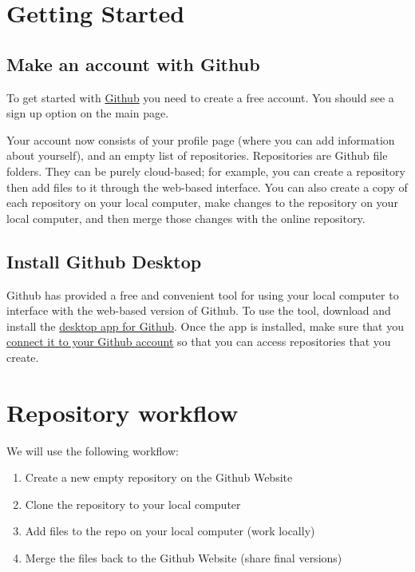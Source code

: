 \documentclass[]{book}
\providecommand{\tightlist}{%
  \setlength{\itemsep}{0pt}\setlength{\parskip}{0pt}}
\theoremstyle{definition}
\theoremstyle{definition}
\theoremstyle{definition}
\theoremstyle{remark}
\begin{document}
\section{Getting Started}\label{getting-started}

\subsection{Make an account with
Github}\label{make-an-account-with-github}

To get started with \href{https://github.com}{Github} you need to create
a free account. You should see a sign up option on the main page.

Your account now consists of your profile page (where you can add
information about yourself), and an empty list of repositories.
Repositories are Github file folders. They can be purely cloud-based;
for example, you can create a repository then add files to it through
the web-based interface. You can also create a copy of each repository
on your local computer, make changes to the repository on your local
computer, and then merge those changes with the online repository.

\subsection{Install Github Desktop}\label{install-github-desktop}

Github has provided a free and convenient tool for using your local
computer to interface with the web-based version of Github. To use the
tool, download and install the \href{https://desktop.github.com}{desktop
app for Github}. Once the app is installed, make sure that you
\href{https://help.github.com/desktop/guides/getting-started-with-github-desktop/authenticating-to-github/}{connect
it to your Github account} so that you can access repositories that you
create.

\section{Repository workflow}\label{repository-workflow}

We will use the following workflow:

\begin{enumerate}
\def\labelenumi{\arabic{enumi}.}
\tightlist
\item
  Create a new empty repository on the Github Website
\item
  Clone the repository to your local computer
\item
  Add files to the repo on your local computer (work locally)
\item
  Merge the files back to the Github Website (share final versions)
\end{enumerate}
\end{document}
